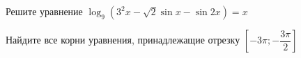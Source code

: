 \begin{ex}
	\begin{condition}
		\begin{enumcols}[label=\asbuk*)]
			\item Решите уравнение \( \log_9 (3^2x -\sqrt{2}\sin x - \sin 2x ) = x \)
			\item Найдите все корни уравнения, принадлежащие отрезку \( \left[-3\pi;-\dfrac{3\pi}{2}\right] \)
		\end{enumcols}
	\end{condition}
\end{ex}